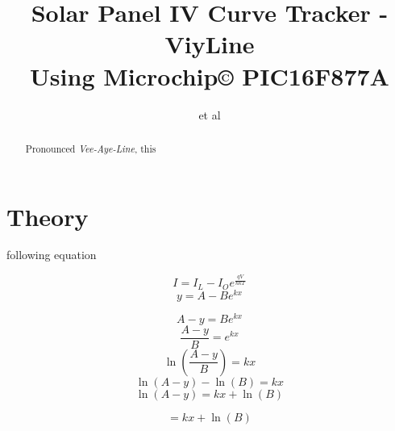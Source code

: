 \documentclass[journal,a4paper]{IEEEtran}
\begin{document}
    \title{
        Solar Panel IV Curve Tracker - ViyLine
        \\ {\Large Using Microchip© PIC16F877A}
    }

    \author{et al}
    \maketitle

    \begin{abstract}
        Pronounced \emph{Vee-Aye-Line}, this
    \end{abstract}

    \section{Theory}
         following equation

        $$I = I_L - I_O e^{\frac{qV}{nkT}}$$
        $$y = A - B e^{kx}$$



        $$A - y = B e^{kx}$$
        $$\frac{A - y}{B} = e^{kx}$$
        $$\ln \left( \frac{A - y}{B} \right) = kx$$
        $$\ln(A - y) - \ln(B) = kx$$
        $$\ln(A - y) = kx + \ln(B)$$

        $$ = kx + \ln(B)$$





\end{document}
